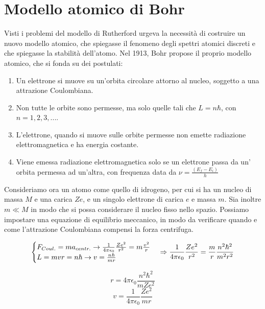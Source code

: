 
\section{Modello atomico di Bohr}

Visti i problemi del modello di Rutherford urgeva la necessità di costruire un nuovo modello atomico, che spiegasse il fenomeno degli spettri atomici discreti e che spiegasse la stabilità dell'atomo.
Nel 1913, Bohr propose il proprio modello atomico, che si fonda su dei postulati:

\begin{enumerate}
\item Un elettrone si muove su un'orbita circolare attorno al nucleo, soggetto a una attrazione Coulombiana.
\item Non tutte le orbite sono permesse, ma solo quelle tali che $L=n\hbar$, con $n=1, 2, 3, ... $.
\item L'elettrone, quando si muove sulle orbite permesse non emette radiazione elettromagnetica e ha energia costante.
\item Viene emessa radiazione elettromagnetica solo se un elettrone passa da un' orbita permessa ad un'altra, con frequenza data da $ \nu = 	\frac{(E_f - E_i)}{h}$
\end{enumerate}

Consideriamo ora un atomo come quello di idrogeno, per cui si ha un nucleo di massa $M$ e una carica $Z e$, e un singolo elettrone di carica $e$ e massa $m$.
Sia inoltre $m \ll M$ in modo che si possa considerare il nucleo fisso nello spazio.
Possiamo impostare una equazione di equilibrio meccanico, in modo da verificare quando e come l'attrazione Coulombiana compensi la forza centrifuga.

\begin{equation}
\begin{cases}
	F_{Coul.} = ma_{centr.} \rightarrow \frac{1}{4\pi \epsilon_0} \frac{Z e^2}{r^2} = m \frac{v^2}{r} \\
	L = m v r = n \hbar 	\rightarrow 	v = \frac{n \hbar}{m r} 
\end{cases}
\Rightarrow \frac{1}{4\pi \epsilon_0} \frac{Z e^2}{r^2} = \frac{m}{r} \frac{n^2 \hbar^2}{m^2 r^2} \\
\end{equation}

$$ r = 4\pi\epsilon_0 \frac{ n^2 \hbar^2}{m Z e^2} $$
$$ v = \frac{1}{4\pi\epsilon_0} \frac{Z e^2}{m r} $$

